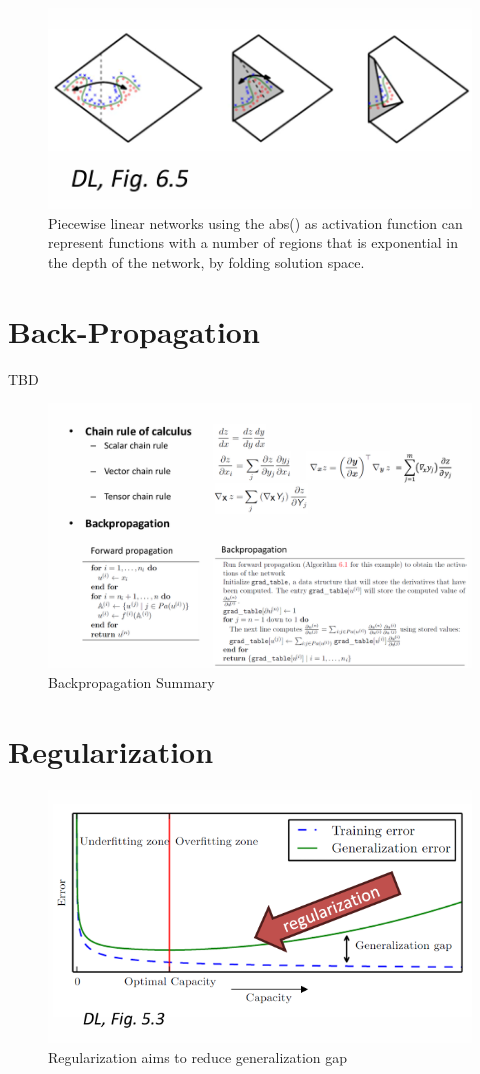 \documentclass[../Main.tex]{subfiles}
\begin{document}
\begin{figure}[H]
    \centering
    \includegraphics[width=0.5\linewidth]{Images/absfolding.png}
    \caption{Piecewise linear 
    networks using the abs() as activation 
    function can represent functions with a 
    number of regions that is exponential in 
    the depth of the network, by folding solution space.}
\end{figure}

\section{Back-Propagation}
TBD

\begin{figure}[H]
    \centering
    \includegraphics[width=1\linewidth]{Images/deepl/backprop-summary.png}
    \caption{Backpropagation Summary}
\end{figure}

\section{Regularization}

\begin{figure}[H]
    \centering
    \includegraphics[width=0.75\linewidth]{Images/deepl/regularization.png}
    \caption{Regularization aims to reduce generalization gap}
\end{figure}
\end{document}
